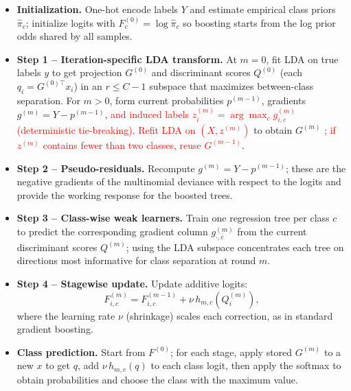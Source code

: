 \documentclass[11pt,a4paper]{article}
\providecommand{\DIFaddtex}[1]{\textcolor{red}{#1}}
\providecommand{\DIFaddbegin}{}
\providecommand{\DIFaddend}{}
\providecommand{\DIFadd}[1]{\texorpdfstring{\DIFaddtex{#1}}{#1}}
\begin{document}
\begin{itemize}
    \item \textbf{Initialization.} One-hot encode labels $Y$ and estimate empirical class priors $\hat{\pi}_c$; initialize logits with $F^{(0)}_c = \log \hat{\pi}_c$ so boosting starts from the log prior odds shared by all samples.

    \item \textbf{Step 1 – Iteration-specific LDA transform.} At $m=0$, fit LDA on true labels $y$ to get projection $G^{(0)}$ and discriminant scores $Q^{(0)}$ (each $q_i = G^{(0)\top} x_i$) in an $r \le C-1$ subspace that maximizes between-class separation.  
    For $m>0$, form current probabilities $p^{(m-1)}$, gradients $g^{(m)} = Y - p^{(m-1)}$,  \DIFaddbegin \DIFadd{and induced labels $z_i^{(m)}=\arg\max_c g^{(m)}_{i,c}$ (deterministic tie-breaking). Refit LDA on $(X,z^{(m)})$ }\DIFaddend to obtain $G^{(m)}$ \DIFaddbegin \DIFadd{; if $z^{(m)}$ contains fewer than two classes, reuse $G^{(m-1)}$}\DIFaddend .

    \item \textbf{Step 2 – Pseudo-residuals.} Recompute $g^{(m)} = Y - p^{(m-1)}$; these are the negative gradients of the multinomial deviance with respect to the logits and provide the working response for the boosted trees.

    \item \textbf{Step 3 – Class-wise weak learners.} Train one regression tree per class $c$ to predict the corresponding gradient column $g^{(m)}_{\cdot,c}$ from the current discriminant scores $Q^{(m)}$; using the LDA subspace concentrates each tree on directions most informative for class separation at round $m$.

    \item \textbf{Step 4 – Stagewise update.} Update additive logits:
    \[
    F^{(m)}_{i,c} = F^{(m-1)}_{i,c} + \nu \, h_{m,c}\left(Q^{(m)}_i\right),
    \]
    where the learning rate $\nu$ (shrinkage) scales each correction, as in standard gradient boosting.

    \item \textbf{Class prediction.} Start from $F^{(0)}$; for each stage, apply stored $G^{(m)}$ to a new $x$ to get $q$, add $\nu \, h_{m,c}(q)$ to each class logit, then apply the softmax to obtain probabilities and choose the class with the maximum value.
\end{itemize}
\end{document}
